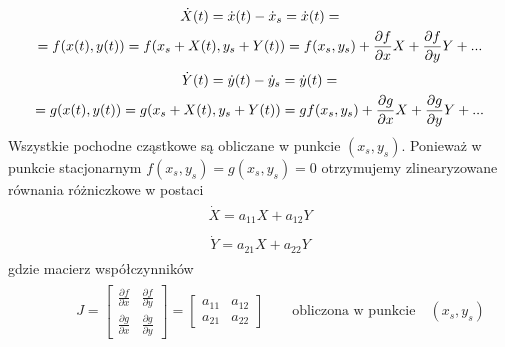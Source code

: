 \documentclass[a4paper,12pt,polish]{sphinxmanual}
\begin{document}
\label{ch1/chI023:equation-eqn29}\begin{gather}
\begin{split}\dot X(t) = \dot x(t) - \dot x_s  = \dot x(t) =\end{split}\label{ch1/chI023-eqn29}\\\begin{split}= f(x(t), y(t)) = f(x_s +X(t), y_s + Y(t))  = f(x_s, y_s) + \frac{\partial f}{\partial x}  X + \frac{\partial f}{\partial y} Y+ ...\end{split}\notag
\end{gather}\label{ch1/chI023:equation-eqn30}\begin{gather}
\begin{split} \dot Y(t)= \dot y(t) - \dot y_s  = \dot y(t) =\end{split}\label{ch1/chI023-eqn30}\\\begin{split} =  g(x(t), y(t)) =g(x_s +X(t), y_s + Y(t))  = gf(x_s, y_s) + \frac{\partial g}{\partial x}  X + \frac{\partial g}{\partial y} Y + ...\end{split}\notag
\end{gather}
Wszystkie pochodne cząstkowe są obliczane w punkcie $(x_s, y_s)$. Ponieważ w punkcie stacjonarnym $f(x_s, y_s)=g(x_s, y_s)=0$ otrzymujemy zlinearyzowane równania różniczkowe w postaci
\label{ch1/chI023:equation-eqn31}\begin{gather}
\begin{split}\dot X =  a_{11} X +  a_{12} Y\end{split}\label{ch1/chI023-eqn31}
\end{gather}\label{ch1/chI023:equation-eqn32}\begin{gather}
\begin{split} \dot Y=  a_{21} X +  a_{22} Y\end{split}\label{ch1/chI023-eqn32}
\end{gather}
gdzie macierz współczynników
\label{ch1/chI023:equation-eqn33}\begin{gather}
\begin{split} \qquad \quad J = \begin{bmatrix}\frac{ \partial f}{\partial x}& \frac{\partial f}{\partial y}\\ \frac{\partial g}{\partial x}& \frac{\partial g}{\partial y}  \end{bmatrix}  =   \begin{bmatrix}a_{11} &  a_{12} \\ a_{21}& a_{22}  \end{bmatrix}   \qquad \mbox{obliczona w punkcie} \quad (x_s, y_s)\end{split}\label{ch1/chI023-eqn33}
\end{gather}
\end{document}

